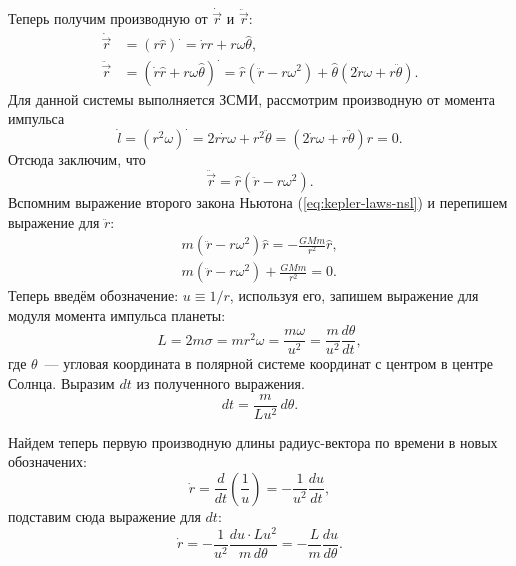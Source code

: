 Теперь получим производную от $\dot{\vec{r}}$ и $\ddot{\vec{r}}$:
\begin{align}
	\dot{\vec{r}} &= (r \hat{r})^{\cdot} = \dot{r} \hat{r} + r \omega \hat{\theta}, \nonumber\\
	\ddot{\vec{r}} &= (\dot{r} \hat{r} + r \omega \hat{\theta})^{\cdot} = \hat{r} (\ddot{r} - r \omega^2) + \hat{\theta} (2\dot{r}\omega + r \ddot{\theta}). 
\end{align}
Для данной системы выполняется ЗСМИ, рассмотрим производную от момента импульса
\begin{equation*}
	\dot{l} = (r^2 \omega)^{\cdot} = 2 r \dot{r} \omega + r^2 \ddot{\theta} = (2\dot{r}\omega + r \ddot{\theta})r = 0.
\end{equation*}
Отсюда заключим, что
\begin{equation}
	\ddot{\vec{r}} = \hat{r} (\ddot{r} - r \omega^2).
\end{equation}
Вспомним выражение второго закона Ньютона (\ref{eq:kepler-laws-nsl}) и перепишем выражение для $\ddot{r}$:
\begin{gather}
	m (\ddot{r} - r \omega^2) \hat{r} = - \frac{GMm}{r^2} \hat{r}, \nonumber\\
	m (\ddot{r} - r \omega^2) + \frac{GMm}{r^2} = 0.
	\label{eq:kepler-laws-difeq}
\end{gather}
Теперь введём обозначение: $u \equiv 1/r$, используя его, запишем выражение для модуля момента импульса планеты:
\begin{equation*}
    L = 2 m \sigma = m r^2 \omega = \frac{m \omega}{u^2} = \frac{m}{u^2} \frac{d \theta}{d t},
\end{equation*}
где $\theta$~--- угловая координата в полярной системе координат с центром в центре Солнца.
Выразим $dt$ из полученного выражения.
\begin{equation*}
    dt = \frac{m}{L u^2} \,d \theta.
\end{equation*}

Найдем теперь первую производную длины радиус-вектора по времени в новых обозначених:
\begin{equation*}
    \dot{r} = \frac{d}{d t} \left( \frac{1}{u} \right) = - \frac{1}{u^2} \frac{du}{dt},
\end{equation*}
подставим сюда выражение для $dt$:
\begin{equation*}
    \dot{r} = - \frac{1}{u^2} \frac{du \cdot L u^2}{m \,d \theta} = - \frac{L}{m} \frac{d u}{d \theta}.
\end{equation*}

